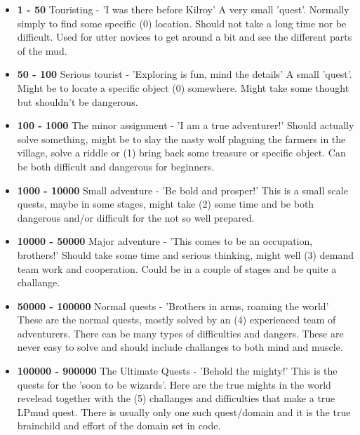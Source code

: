 \begin{itemize}
\item{\bf 1 - 50} Touristing  - 'I was there before Kilroy' 
        A very small 'quest'. Normally simply to find some specific
       (0)  location. Should not take a long time nor be difficult.
        Used for utter novices to get around a bit and see the
        different parts of the mud.

\item{\bf 50 - 100} Serious tourist - 'Exploring is fun, mind the details'
        A small 'quest'. Might be to locate a specific object 
       (0)  somewhere. Might take some thought but shouldn't be
        dangerous.

\item{\bf 100 - 1000} The minor assignment - 'I am a true adventurer!'
        Should actually solve something, might be to slay the nasty
        wolf plaguing the farmers in the village, solve a riddle or
       (1)  bring back some treasure or specific object. Can be both
        difficult and dangerous for beginners.

\item{\bf 1000 - 10000} Small adventure - 'Be bold and prosper!'
        This is a small scale quests, maybe in some stages, might take
       (2)  some time and be both dangerous and/or difficult for the
            not so well prepared.
 
\item{\bf 10000 - 50000} Major adventure - 'This comes to be an occupation, brothers!'
        Should take some time and serious thinking, might well
       (3)  demand team work and cooperation. Could be in a couple of
        stages and be quite a challange.

\item{\bf 50000 - 100000} Normal quests - 'Brothers in arms, roaming the world'
                These are the normal quests, mostly solved by an
       (4)  experienced team of adventurers. There can be many types
        of difficulties and dangers. These are never easy to solve
        and should include challanges to both mind and muscle.

\item{\bf 100000 - 900000} The Ultimate Quests - 'Behold the mighty!'
                This is the quests for the 'soon to be wizards'. Here are
        the true mights in the world revelead together with the
       (5)  challanges and difficulties that make a true LPmud quest.
        There is usually only one such quest/domain and it is the
        true brainchild and effort of the domain set in code.
\end{itemize}

